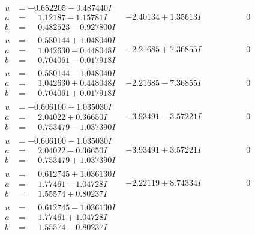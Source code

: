 \documentclass[1p]{elsarticle_modified}
\theoremstyle{definition}
\begin{document}
$$\begin{array}{c|c|c}
\begin{aligned}
u &= -0.652205 - 0.487440 I \\
a &= \phantom{-}1.12187 - 1.15781 I \\
b &= \phantom{-}0.482523 - 0.927800 I\end{aligned}
 & -2.40134 + 1.35613 I & \phantom{-0.000000 } 0 \\ \hline\begin{aligned}
u &= \phantom{-}0.580144 + 1.048040 I \\
a &= \phantom{-}1.042630 - 0.448048 I \\
b &= \phantom{-}0.704061 - 0.017918 I\end{aligned}
 & -2.21685 + 7.36855 I & \phantom{-0.000000 } 0 \\ \hline\begin{aligned}
u &= \phantom{-}0.580144 - 1.048040 I \\
a &= \phantom{-}1.042630 + 0.448048 I \\
b &= \phantom{-}0.704061 + 0.017918 I\end{aligned}
 & -2.21685 - 7.36855 I & \phantom{-0.000000 } 0 \\ \hline\begin{aligned}
u &= -0.606100 + 1.035030 I \\
a &= \phantom{-}2.04022 + 0.36650 I \\
b &= \phantom{-}0.753479 - 1.037390 I\end{aligned}
 & -3.93491 - 3.57221 I & \phantom{-0.000000 } 0 \\ \hline\begin{aligned}
u &= -0.606100 - 1.035030 I \\
a &= \phantom{-}2.04022 - 0.36650 I \\
b &= \phantom{-}0.753479 + 1.037390 I\end{aligned}
 & -3.93491 + 3.57221 I & \phantom{-0.000000 } 0 \\ \hline\begin{aligned}
u &= \phantom{-}0.612745 + 1.036130 I \\
a &= \phantom{-}1.77461 - 1.04728 I \\
b &= \phantom{-}1.55574 + 0.80237 I\end{aligned}
 & -2.22119 + 8.74334 I & \phantom{-0.000000 } 0 \\ \hline\begin{aligned}
u &= \phantom{-}0.612745 - 1.036130 I \\
a &= \phantom{-}1.77461 + 1.04728 I \\
b &= \phantom{-}1.55574 - 0.80237 I\end{aligned}

\end{array}$$
\end{document}
